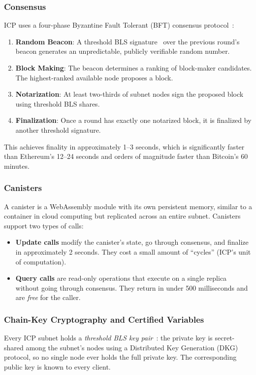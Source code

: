\documentclass[conference]{IEEEtran}
\begin{document}
\subsubsection{Consensus}
ICP uses a four-phase Byzantine Fault Tolerant (BFT) consensus protocol~\cite{hanke2018dfinity}:
\begin{enumerate}
  \item \textbf{Random Beacon}: A threshold BLS signature~\cite{boneh2001bls} over the previous round's beacon generates an unpredictable, publicly verifiable random number.
  \item \textbf{Block Making}: The beacon determines a ranking of block-maker candidates. The highest-ranked available node proposes a block.
  \item \textbf{Notarization}: At least two-thirds of subnet nodes sign the proposed block using threshold BLS shares.
  \item \textbf{Finalization}: Once a round has exactly one notarized block, it is finalized by another threshold signature.
\end{enumerate}

This achieves finality in approximately 1--3 seconds, which is significantly faster than Ethereum's 12--24 seconds and orders of magnitude faster than Bitcoin's 60 minutes.

\subsubsection{Canisters}
A canister is a WebAssembly module with its own persistent memory, similar to a container in cloud computing but replicated across an entire subnet. Canisters support two types of calls:
\begin{itemize}[leftmargin=*]
  \item \textbf{Update calls} modify the canister's state, go through consensus, and finalize in approximately 2 seconds. They cost a small amount of ``cycles'' (ICP's unit of computation).
  \item \textbf{Query calls} are read-only operations that execute on a single replica without going through consensus. They return in under 500 milliseconds and are \emph{free} for the caller.
\end{itemize}

\subsubsection{Chain-Key Cryptography and Certified Variables}
Every ICP subnet holds a \emph{threshold BLS key pair}~\cite{boneh2001bls}: the private key is secret-shared among the subnet's nodes using a Distributed Key Generation (DKG) protocol, so no single node ever holds the full private key. The corresponding public key is known to every client.
\end{document}

